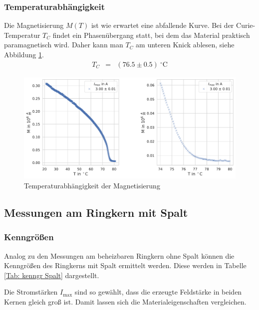 \documentclass[12pt,a4paper]{scrartcl}
\numberwithin{equation}{section} %
\begin{document}
\hypertarget{temperaturabhuxe4ngigkeit-1}{%
\subsubsection{Temperaturabhängigkeit}\label{temperaturabhuxe4ngigkeit-1}}
Die Magnetisierung $M(T)$ ist wie erwartet eine abfallende Kurve. Bei der Curie-Temperatur $T_C$ findet ein Phasenübergang statt, bei dem das Material praktisch paramagnetisch wird. Daher kann man $T_C$ am unteren Knick ablesen, siehe Abbildung \ref{Abb: Temperatur}.
\begin{eqnarray*}
    T_C &=& (76.5 \pm 0.5) \ ^\circ\mathrm C
\end{eqnarray*}

\begin{figure}[ht]
\centering
\includegraphics[scale=0.5]{../media/B2.4/3.3.3.pdf}
\caption{Temperaturabhängigkeit der Magnetisierung}
\label{Abb: Temperatur}
\end{figure}

\hypertarget{messungen-am-ringkern-mit-spalt-1}{%
\subsection{Messungen am Ringkern mit Spalt}\label{messungen-am-ringkern-mit-spalt-1}}

\hypertarget{kenngruxf6uxdfen-1}{%
\subsubsection{Kenngrößen}\label{kenngruxf6uxdfen-1}}
Analog zu den Messungen am beheizbaren Ringkern ohne Spalt können die Kenngrößen des Ringkerns mit Spalt ermittelt werden. Diese werden in Tabelle \ref{Tab: kenngr Spalt} dargestellt.

Die Stromstärken $I_\mathrm{max}$ sind so gewählt, dass die erzeugte Feldstärke in beiden Kernen gleich groß ist. Damit lassen sich die Materialeigenschaften vergleichen.
\end{document}

